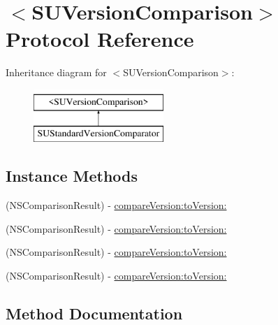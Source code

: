 \hypertarget{protocol_s_u_version_comparison-p}{}\section{$<$S\+U\+Version\+Comparison$>$ Protocol Reference}
\label{protocol_s_u_version_comparison-p}
Inheritance diagram for $<$S\+U\+Version\+Comparison$>$\+:\begin{figure}[H]
\begin{center}
\leavevmode
\includegraphics[height=2.000000cm]{protocol_s_u_version_comparison-p}
\end{center}
\end{figure}
\subsection*{Instance Methods}
\begin{DoxyCompactItemize}
\item 
(N\+S\+Comparison\+Result) -\/ \mbox{\hyperlink{protocol_s_u_version_comparison-p_a7ee54ef49cade9b0a856bdc8c7fff2f4}{compare\+Version\+:to\+Version\+:}}
\item 
(N\+S\+Comparison\+Result) -\/ \mbox{\hyperlink{protocol_s_u_version_comparison-p_a7ee54ef49cade9b0a856bdc8c7fff2f4}{compare\+Version\+:to\+Version\+:}}
\item 
(N\+S\+Comparison\+Result) -\/ \mbox{\hyperlink{protocol_s_u_version_comparison-p_a7ee54ef49cade9b0a856bdc8c7fff2f4}{compare\+Version\+:to\+Version\+:}}
\item 
(N\+S\+Comparison\+Result) -\/ \mbox{\hyperlink{protocol_s_u_version_comparison-p_a7ee54ef49cade9b0a856bdc8c7fff2f4}{compare\+Version\+:to\+Version\+:}}
\end{DoxyCompactItemize}


\subsection{Method Documentation}
\mbox{\label{protocol_s_u_version_comparison-p_a7ee54ef49cade9b0a856bdc8c7fff2f4}} 
